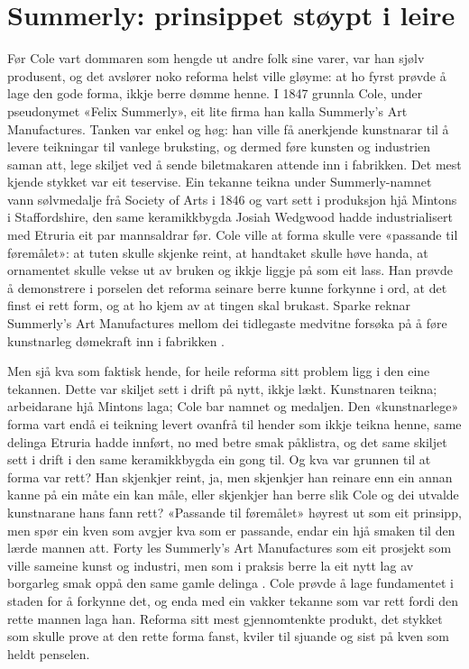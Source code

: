 \section{Summerly: prinsippet støypt i leire}

Før Cole vart dommaren som hengde ut andre folk sine varer, var han sjølv produsent, og det avslører noko reforma helst ville gløyme: at ho fyrst prøvde å lage den gode forma, ikkje berre dømme henne. I 1847 grunnla Cole, under pseudonymet «Felix Summerly», eit lite firma han kalla Summerly's Art Manufactures. Tanken var enkel og høg: han ville få anerkjende kunstnarar til å levere teikningar til vanlege bruksting, og dermed føre kunsten og industrien saman att, lege skiljet ved å sende biletmakaren attende inn i fabrikken. Det mest kjende stykket var eit teservise. Ein tekanne teikna under Summerly-namnet vann sølvmedalje frå Society of Arts i 1846 og vart sett i produksjon hjå Mintons i Staffordshire, den same keramikkbygda Josiah Wedgwood hadde industrialisert med Etruria eit par mannsaldrar før. Cole ville at forma skulle vere «passande til føremålet»: at tuten skulle skjenke reint, at handtaket skulle høve handa, at ornamentet skulle vekse ut av bruken og ikkje liggje på som eit lass. Han prøvde å demonstrere i porselen det reforma seinare berre kunne forkynne i ord, at det finst ei rett form, og at ho kjem av at tingen skal brukast. Sparke reknar Summerly's Art Manufactures mellom dei tidlegaste medvitne forsøka på å føre kunstnarleg dømekraft inn i fabrikken \autocite{sparke2004}.

Men sjå kva som faktisk hende, for heile reforma sitt problem ligg i den eine tekannen. Dette var skiljet sett i drift på nytt, ikkje lækt. Kunstnaren teikna; arbeidarane hjå Mintons laga; Cole bar namnet og medaljen. Den «kunstnarlege» forma vart endå ei teikning levert ovanfrå til hender som ikkje teikna henne, same delinga Etruria hadde innført, no med betre smak påklistra, og det same skiljet sett i drift i den same keramikkbygda ein gong til. Og kva var grunnen til at forma var rett? Han skjenkjer reint, ja, men skjenkjer han reinare enn ein annan kanne på ein måte ein kan måle, eller skjenkjer han berre slik Cole og dei utvalde kunstnarane hans fann rett? «Passande til føremålet» høyrest ut som eit prinsipp, men spør ein kven som avgjer kva som er passande, endar ein hjå smaken til den lærde mannen att. Forty les Summerly's Art Manufactures som eit prosjekt som ville sameine kunst og industri, men som i praksis berre la eit nytt lag av borgarleg smak oppå den same gamle delinga \autocite{forty1986}. Cole prøvde å lage fundamentet i staden for å forkynne det, og enda med ein vakker tekanne som var rett fordi den rette mannen laga han. Reforma sitt mest gjennomtenkte produkt, det stykket som skulle prove at den rette forma fanst, kviler til sjuande og sist på kven som heldt penselen.

